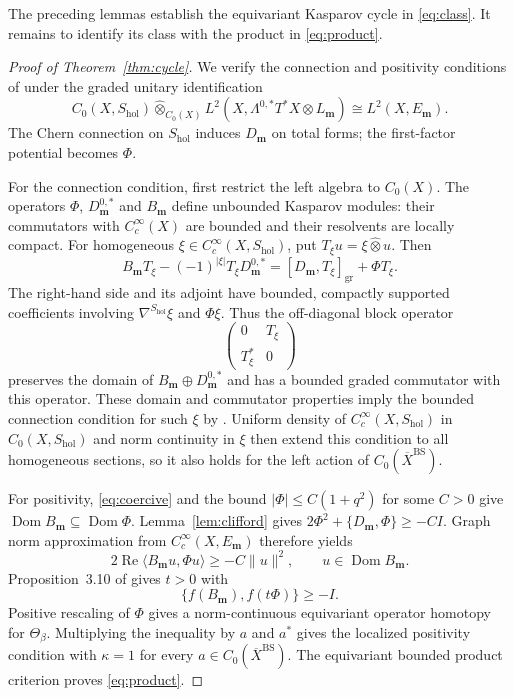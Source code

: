 \documentclass[11pt]{article}
\theoremstyle{definition}
\theoremstyle{plain}
\numberwithin{equation}{section}
\newcommand{\BS}{\mathrm{BS}}
\begin{document}
The preceding lemmas establish the equivariant Kasparov cycle
in \eqref{eq:class}. It remains to identify its class with the
product in \eqref{eq:product}.

\begin{proof}[Proof of Theorem~\ref{thm:cycle}]
We verify the connection and positivity conditions of
\cite[Theorem~2.2]{vanDenDungen} under the graded unitary
identification
\[
 C_0(X,S_{\mathrm{hol}})\widehat\otimes_{C_0(X)}
 L^2(X,\Lambda^{0,*}T^*X\otimes L_{\boldsymbol m})
       \cong L^2(X,E_{\boldsymbol m}).
\]
The Chern connection on $S_{\mathrm{hol}}$ induces
$D_{\boldsymbol m}$ on total forms; the first-factor potential
becomes $\Phi$.

For the connection condition, first restrict the left algebra to
$C_0(X)$. The operators $\Phi$, $D_{\boldsymbol m}^{0,*}$ and
$B_{\boldsymbol m}$ define unbounded Kasparov modules:
their commutators with $C_c^\infty(X)$ are bounded and their
resolvents are locally compact.
For homogeneous $\xi\in C_c^\infty(X,S_{\mathrm{hol}})$,
put $T_\xi u=\xi\widehat\otimes u$. Then
\[
 B_{\boldsymbol m}T_\xi-(-1)^{|\xi|}T_\xi D_{\boldsymbol m}^{0,*}
       =[D_{\boldsymbol m},T_\xi]_{\mathrm{gr}}+\Phi T_\xi.
\]
The right-hand side and its adjoint have bounded, compactly
supported coefficients involving $\nabla^{S_{\mathrm{hol}}}\xi$
and $\Phi\xi$. Thus the off-diagonal block operator
\[
 \begin{pmatrix}
  0&T_\xi\\
  T_\xi^*&0
 \end{pmatrix}
\]
preserves the domain of
$B_{\boldsymbol m}\oplus D_{\boldsymbol m}^{0,*}$
and has a bounded graded commutator with this operator.
These domain and commutator properties imply the bounded
connection condition for such $\xi$
by \cite[Proposition~2.11]{vanDenDungen}.
Uniform density of $C_c^\infty(X,S_{\mathrm{hol}})$ in
$C_0(X,S_{\mathrm{hol}})$ and norm continuity in $\xi$
then extend this condition to all homogeneous sections,
so it also holds for the left action of $C_0(\overline X^{\BS})$.

For positivity, \eqref{eq:coercive} and the bound
$|\Phi|\leq C(1+q^2)$ for some $C>0$ give
$\operatorname{Dom}B_{\boldsymbol m}
 \subseteq\operatorname{Dom}\Phi$.
Lemma~\ref{lem:clifford} gives
$2\Phi^2+\{D_{\boldsymbol m},\Phi\}\geq-CI$.
Graph norm approximation from $C_c^\infty(X,E_{\boldsymbol m})$
therefore yields
\[
 2\operatorname{Re}\langle B_{\boldsymbol m}u,\Phi u\rangle
 \geq-C\|u\|^2,
 \qquad u\in\operatorname{Dom}B_{\boldsymbol m}.
\]
Proposition~3.10 of \cite{vanDenDungen} gives $t>0$ with
\[
 \{f(B_{\boldsymbol m}),f(t\Phi)\}\geq-I.
\]
Positive rescaling of $\Phi$ gives a norm-continuous equivariant
operator homotopy for $\Theta_\beta$. Multiplying the inequality
by $a$ and $a^*$ gives the localized positivity condition with
$\kappa=1$ for every $a\in C_0(\overline X^{\BS})$. The equivariant bounded
product criterion proves \eqref{eq:product}.
\end{proof}
\end{document}
